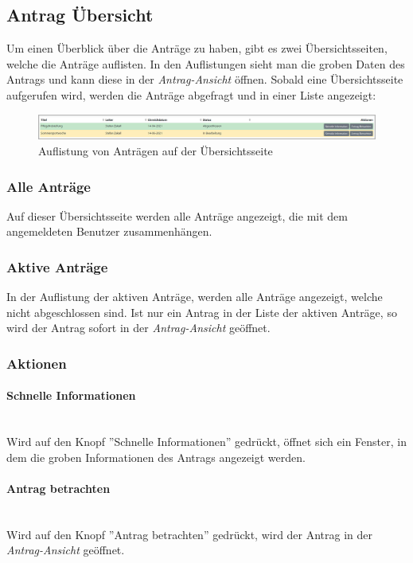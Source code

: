 \subsection{Antrag Übersicht}
\label{sec:antrag_uebersicht}
Um einen Überblick über die Anträge zu haben, gibt es zwei Übersichtsseiten, welche die Anträge auflisten. In den Auflistungen sieht man die groben Daten des Antrags und kann diese in der \textit{Antrag-Ansicht} öffnen. Sobald eine Übersichtsseite aufgerufen wird, werden die Anträge abgefragt und in einer Liste angezeigt:
\begin{figure}[H]
	\centering
	\includegraphics[width=1\linewidth]{images/rfoster_implementierung/liste_antrag}
	\caption[Liste der Anträge]{Auflistung von Anträgen auf der Übersichtsseite}
	\label{fig:listeantrag}
\end{figure}

\subsubsection{Alle Anträge}
Auf dieser Übersichtsseite werden alle Anträge angezeigt, die mit dem angemeldeten Benutzer zusammenhängen.
\subsubsection{Aktive Anträge}
In der Auflistung der aktiven Anträge, werden alle Anträge angezeigt, welche nicht abgeschlossen sind. Ist nur ein Antrag in der Liste der aktiven Anträge, so wird der Antrag sofort in der \textit{Antrag-Ansicht} geöffnet.
\subsubsection{Aktionen}
\paragraph{Schnelle Informationen}~\\
Wird auf den Knopf ''Schnelle Informationen'' gedrückt, öffnet sich ein Fenster, in dem die groben Informationen des Antrags angezeigt werden.
\paragraph{Antrag betrachten}~\\
Wird auf den Knopf ''Antrag betrachten'' gedrückt, wird der Antrag in der \textit{Antrag-Ansicht} geöffnet.
\newpage
